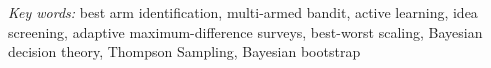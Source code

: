 \documentclass[nonblindrev]{informs3}
\begin{document}
~ \\
~ \\
\noindent \emph{Key words:}
best arm identification, multi-armed bandit, active learning, idea screening, adaptive maximum-difference surveys, best-worst scaling, Bayesian decision theory, Thompson Sampling, Bayesian bootstrap

\newpage

\OneAndAHalfSpacedXI



%



\end{document}
